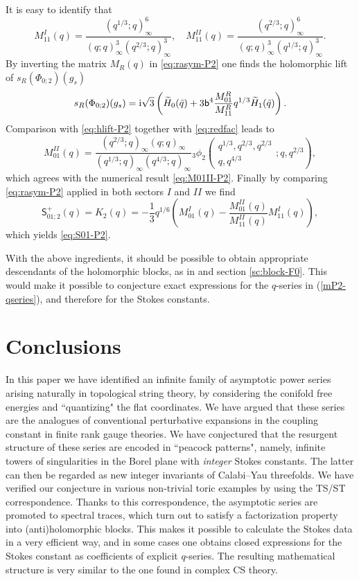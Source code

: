 \documentclass[a4paper,11pt]{article}
\theoremstyle{definition}
\newcommand{\ri}{{\rm i}}
\def\tq{{\tilde{q}}}
\newcommand{\bb}{\mathsf{b}}
\newcommand{\wt}[1]{\widetilde{#1}}
\def\ms{\mathsf}
\newcommand{\qhg}[6]{{}_#1\phi_{#2}
  \left(\begin{matrix}
    #3  \\
    #4
  \end{matrix} ; #5, #6\right)}
\begin{document}
It is easy to identify that
\begin{equation}
  M_{11}^{I}(q)
  = \frac{(q^{1/3};q)_\infty^6}{(q;q)_\infty^{3}(q^{2/3};q)_\infty^3},  
  \quad
  M_{11}^{II}(q)
  =\frac{(q^{2/3};q)_\infty^6}{(q;q)_\infty^{3}(q^{1/3};q)_\infty^3}.
\end{equation}
By inverting the matrix $M_R(q)$ in \eqref{eq:rasym-P2} one finds
the holomorphic lift of $s_R(\Phi_{0;2})(g_s)$
\begin{equation}
  s_R(\Phi_{0;2})(g_s) = \ri\sqrt{3}\left(
    \wt{H}_0(\tq) +
    3\bb^{4}\frac{M^R_{01}}{M^R_{11}}q^{1/3} \wt{H}_1(\tq)
  \right).
\end{equation}
Comparison with \eqref{eq:hlift-P2} together with \eqref{eq:redfac}
leads to
\begin{equation}
  M_{01}^{II}(q) = \frac{(q^{2/3};q)_\infty(q;q)_\infty}
  {(q^{1/3};q)_\infty(q^{4/3};q)_\infty}
  \qhg{3}{2}{q^{1/3},q^{2/3},q^{2/3}}{q,q^{4/3}}{q}{q^{2/3}},
\end{equation}
which agrees with the numerical result \eqref{eq:M01II-P2}.
Finally by comparing \eqref{eq:rasym-P2} applied in both sectors $I$
and $II$ we find
\begin{equation}
  \ms{S}_{01;2}^+(q)=K_2(q) = -\frac{1}{3}q^{1/6}\left(M_{01}^I(q) - \frac{M_{01}^{II}(q)}{M_{11}^{II}(q)}M_{11}^I(q)\right),
\end{equation}
which yields \eqref{eq:S01-P2}.

With the above ingredients, it should be possible to obtain appropriate descendants of the 
holomorphic blocks, as in \cite{ggm1,ggm2} and section \ref{sc:block-F0}. This would make it possible to conjecture
exact expressions for the $q$-series in (\ref{mP2-qseries}), and therefore for the Stokes constants. 

\section{Conclusions}
\label{sec-conclude}
In this paper we have identified an infinite family of asymptotic power series arising naturally in topological string theory, 
by considering the conifold free energies and ``quantizing" the flat coordinates. We have argued that these series are the analogues of conventional perturbative expansions in the coupling constant in finite rank gauge theories. 
We have conjectured that the resurgent structure of these series are encoded in ``peacock patterns", namely, infinite towers of singularities 
in the Borel plane with {\it integer} Stokes constants. The latter can then be regarded as new integer invariants of Calabi--Yau threefolds. 
We have verified our conjecture in various non-trivial toric examples by using the TS/ST correspondence. Thanks to this correspondence, 
the asymptotic series are promoted to spectral traces, which turn out to satisfy a factorization property into (anti)holomorphic blocks. This makes it possible to calculate the Stokes data in a very efficient way, and in some cases one obtains closed expressions for the Stokes constant as coefficients of explicit $q$-series. The resulting mathematical structure is very similar to the one found in complex CS theory. 
\end{document}
